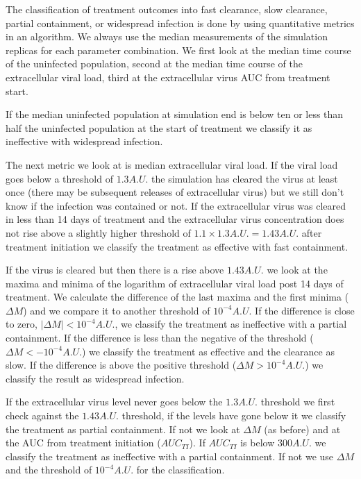 The classification of treatment outcomes into fast clearance, slow clearance, partial containment, or widespread infection is done by using quantitative metrics in an algorithm. We always use the median measurements of the simulation replicas for each parameter combination. We first look at the median time course of the uninfected population, second at the median time course of the extracellular viral load, third at the extracellular virus AUC from treatment start.

If the median uninfected population at simulation end is below ten or less than half the uninfected population at the start of treatment we classify it as ineffective with widespread infection.

The next metric we look at is median extracellular viral load. If the viral load goes below a threshold of $1.3 A.U.$ the simulation has cleared the virus at least once (there may be subsequent releases of extracellular virus) but we still don't know if the infection was contained or not. If the extracellular virus was cleared in less than 14 days of treatment and the extracellular virus concentration does not rise above a slightly higher threshold of $1.1\times1.3 A.U.= 1.43 A.U.$ after treatment initiation we classify the treatment as effective with fast containment. 

If the virus is cleared but then there is a rise above $1.43 A.U.$ we look at the maxima and minima of the logarithm of extracellular viral load post 14 days of treatment. We calculate the difference of the last maxima and the first minima ($\Delta M$) and we compare it to another threshold of $10^{-4} A.U.$ If the difference is close to zero, $|\Delta M| < 10^{-4} A.U.$, we classify the treatment as ineffective with a partial containment. If the difference is less than the negative of the threshold ($\Delta M < -10^{-4} A.U.$) we classify the treatment as effective and the clearance as slow. If the difference is above the positive threshold ($\Delta M > 10^{-4} A.U.$) we classify the result as widespread infection.

If the extracellular virus level never goes below the $1.3 A.U.$ threshold we first check against the $1.43 A.U.$ threshold, if the levels have gone below it we classify the treatment as partial containment. If not we look at $\Delta M$ (as before) and at the AUC from treatment initiation ($AUC_{TI}$). If $AUC_{TI}$ is below $300 A.U.$ we classify the treatment as ineffective with a partial containment. If not we use $\Delta M$ and the threshold of $10^{-4} A.U.$ for the classification.